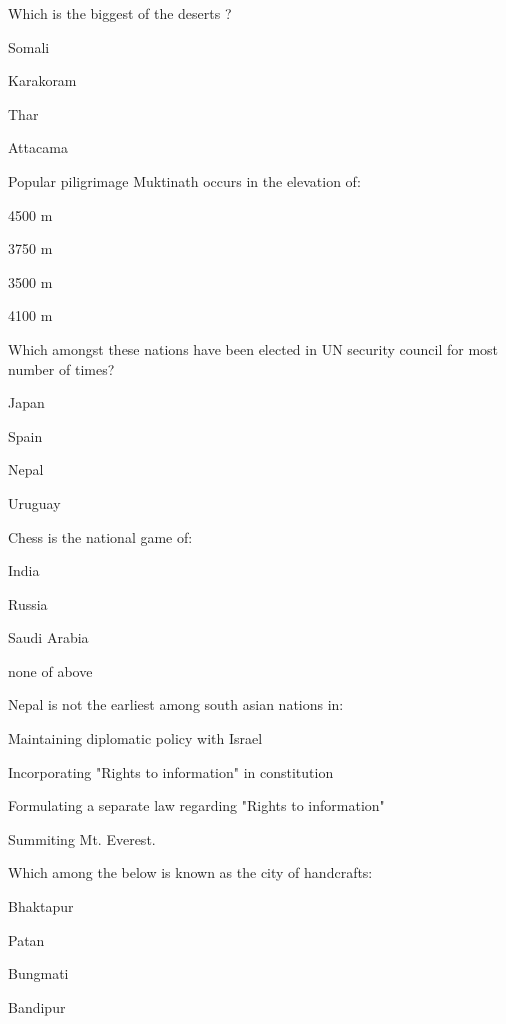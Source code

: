\begin{questions}
\question Which is the biggest of the deserts ?

  \begin{items}
  \item Somali
  \item* Karakoram
  \item Thar
  \item Attacama
  \end{items}

\question Popular piligrimage Muktinath occurs in the elevation of:
  \begin{items}
  \item 4500 m
  \item* 3750 m
  \item 3500 m
  \item 4100 m
  \end{items}

\question Which amongst these nations have been elected in UN security council for most number of times?
  \begin{items}
  \item Japan
  \item Spain
  \item Nepal
  \item* Uruguay
  \end{items}

\question Chess is the national game of:

  \begin{items}
  \item India
  \item* Russia
  \item Saudi Arabia
  \item none of above
  \end{items}

\question Nepal is not the earliest among south asian nations in:
  \begin{items}
  \item Maintaining diplomatic policy with Israel
  \item* Incorporating "Rights to information" in constitution
  \item Formulating a separate law regarding "Rights to information"
  \item Summiting Mt. Everest.
  \end{items}

\question Which among the below is known as the city of handcrafts:
  \begin{items}
  \item Bhaktapur
  \item* Patan
  \item Bungmati
  \item Bandipur
  \end{items}


\end{questions}
